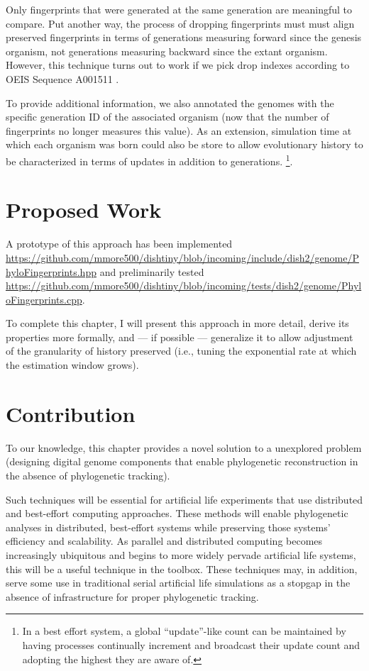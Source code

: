 Only fingerprints that were generated at the same generation are meaningful to compare.
Put another way, the process of dropping fingerprints must must align preserved fingerprints in terms of generations measuring forward since the genesis organism, not generations measuring backward since the extant organism.
However, this technique turns out to work if we pick drop indexes according to OEIS Sequence A001511 \cite{sloane2021a001511}.

To provide additional information, we also annotated the genomes with the specific generation ID of the associated organism (now that the number of fingerprints no longer measures this value).
As an extension, simulation time at which each organism was born could also be store to allow evolutionary history to be characterized in terms of updates in addition to generations.
\footnote{
In a best effort system, a global ``update''-like count can be maintained by having processes continually increment and broadcast their update count and adopting the highest they are aware of.
}.

\section{Proposed Work}

A prototype of this approach has been implemented \url{https://github.com/mmore500/dishtiny/blob/incoming/include/dish2/genome/PhyloFingerprints.hpp} and preliminarily tested \url{https://github.com/mmore500/dishtiny/blob/incoming/tests/dish2/genome/PhyloFingerprints.cpp}.

To complete this chapter, I will present this approach in more detail, derive its properties more formally, and --- if possible --- generalize it to allow adjustment of the granularity of history preserved (i.e., tuning the exponential rate at which the estimation window grows).

\section{Contribution}

To our knowledge, this chapter provides a novel solution to a unexplored problem (designing digital genome components that enable phylogenetic reconstruction in the absence of phylogenetic tracking).

Such techniques will be essential for artificial life experiments that use distributed and best-effort computing approaches.
These methods will enable phylogenetic analyses in distributed, best-effort systems while preserving those systems' efficiency and scalability.
As parallel and distributed computing becomes increasingly ubiquitous and begins to more widely pervade artificial life systems, this will be a useful technique in the toolbox.
These techniques may, in addition, serve some use in traditional serial artificial life simulations as a stopgap in the absence of infrastructure for proper phylogenetic tracking.

